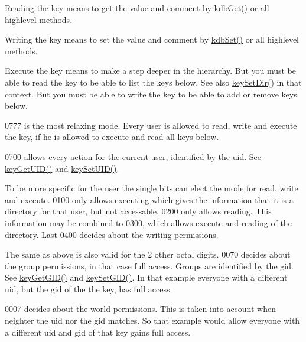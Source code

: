 Reading the key means to get the value and comment by \hyperlink{group__kdb_ga28e385fd9cb7ccfe0b2f1ed2f62453a1}{kdbGet()} or all highlevel methods.

Writing the key means to set the value and comment by \hyperlink{group__kdb_ga11436b058408f83d303ca5e996832bcf}{kdbSet()} or all highlevel methods.

Execute the key means to make a step deeper in the hierarchy. But you must be able to read the key to be able to list the keys below. See also \hyperlink{group__keymeta_gaae575bd86a628a15ee45baa860522e75}{keySetDir()} in that context. But you must be able to write the key to be able to add or remove keys below.

0777 is the most relaxing mode. Every user is allowed to read, write and execute the key, if he is allowed to execute and read all keys below.

0700 allows every action for the current user, identified by the uid. See \hyperlink{group__keymeta_gacaa5060e67b03f50ae49a3620c54bc46}{keyGetUID()} and \hyperlink{group__keymeta_gab5f284f5ecd261e0a290095f50ba1af7}{keySetUID()}.

To be more specific for the user the single bits can elect the mode for read, write and execute. 0100 only allows executing which gives the information that it is a directory for that user, but not accessable. 0200 only allows reading. This information may be combined to 0300, which allows execute and reading of the directory. Last 0400 decides about the writing permissions.

The same as above is also valid for the 2 other octal digits. 0070 decides about the group permissions, in that case full access. Groups are identified by the gid. See \hyperlink{group__keymeta_ga46a95e81d7d7f4e3eb59e60e5f3738c0}{keyGetGID()} and \hyperlink{group__keymeta_ga9e3d0fb3f7ba906e067727b9155d22e3}{keySetGID()}. In that example everyone with a different uid, but the gid of the the key, has full access.

0007 decides about the world permissions. This is taken into account when neighter the uid nor the gid matches. So that example would allow everyone with a different uid and gid of that key gains full access.


